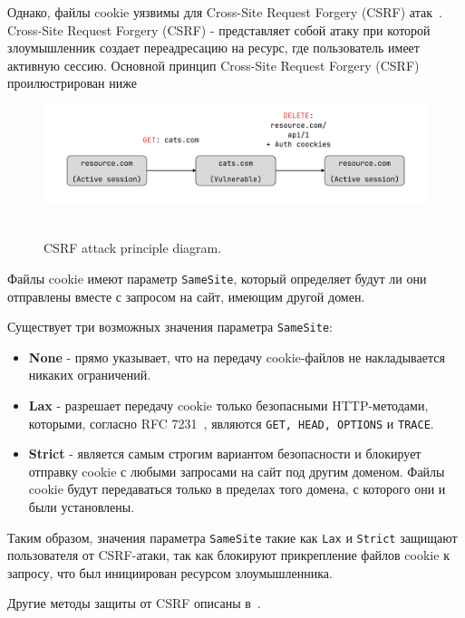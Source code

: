 Однако, файлы cookie уязвимы для Cross-Site Request Forgery (CSRF) атак~\cite{siddiqui2011cross}.
Cross-Site Request Forgery (CSRF) - представляет собой атаку при которой злоумышленник создает переадресацию
на ресурс, где пользователь имеет активную сессию.
Основной принцип Cross-Site Request Forgery (CSRF) проилюстрирован ниже

\begin{figure}[H]
    \centering
    \includegraphics[width=1\textwidth]{img/Csrf_diagram}
    ~\caption{CSRF attack principle diagram.}\label{fig:csrf_diagram}
\end{figure}

Файлы cookie имеют параметр \texttt{SameSite}, который определяет будут ли они отправлены вместе с запросом на сайт,
имеющим другой домен.

Существует три возможных значения параметра \texttt{SameSite}:

\begin{itemize}
    \item \textbf{None} - прямо указывает, что на передачу cookie-файлов не накладывается никаких ограничений.
    \item \textbf{Lax} - разрешает передачу cookie только безопасными HTTP-методами, которыми, согласно
    RFC 7231~\cite{fielding2014rfc}, являются \texttt{GET, HEAD, OPTIONS} и \texttt{TRACE}.
    \item \textbf{Strict} - является самым строгим вариантом безопасности и блокирует отправку cookie с любыми
    запросами на сайт под другим доменом.
    Файлы cookie будут передаваться только в пределах того домена, с которого они и были установлены.
\end{itemize}

Таким образом, значения параметра \texttt{SameSite} такие как \texttt{Lax} и \texttt{Strict} защищают пользователя
от CSRF-атаки, так как блокируют прикрепление файлов cookie к запросу, что был инициирован ресурсом злоумышленника.

Другие методы защиты от CSRF описаны в~\cite{owaspCsrf}.